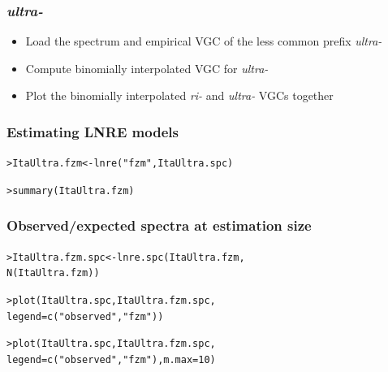 \documentclass[handout,notes=show,t]{beamer} %
\begin{document}
\begin{frame}
  \frametitle{\emph{ultra-}}

  \begin{itemize}
  \item Load the spectrum and empirical VGC of the less common prefix \emph{ultra-}
  \item Compute binomially interpolated VGC for \emph{ultra-}
  \item Plot the binomially interpolated \emph{ri-} and \emph{ultra-}
    VGCs together
  \end{itemize}

\end{frame}


\begin{frame}[fragile]
  \frametitle{Estimating LNRE models}

\begin{alltt}

> ItaUltra.fzm <- lnre("fzm", ItaUltra.spc)

> summary(ItaUltra.fzm)
\end{alltt}

\end{frame}


\begin{frame}[fragile]
  \frametitle{Observed/expected spectra at estimation size}
\begin{alltt}

> ItaUltra.fzm.spc <- lnre.spc(ItaUltra.fzm, 
  N(ItaUltra.fzm))


> plot(ItaUltra.spc, ItaUltra.fzm.spc,
  legend=c("observed","fzm"))


> plot(ItaUltra.spc, ItaUltra.fzm.spc, 
  legend=c("observed","fzm"), m.max=10)
\end{alltt}
\end{frame}




\end{document}
